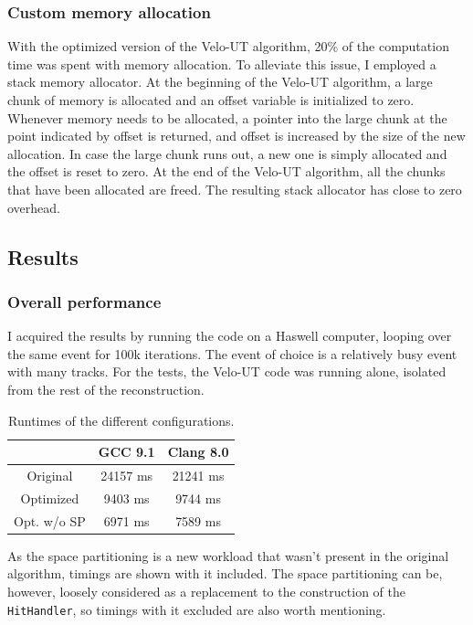 \documentclass[12pt]{article}
\newcommand{\code}[1]{\texttt{#1}}
\begin{document}
\subsubsection{Custom memory allocation}

With the optimized version of the Velo-UT algorithm, 20\% of the computation time was spent with memory allocation. To alleviate this issue, I employed a stack memory allocator. At the beginning of the Velo-UT algorithm, a large chunk of memory is allocated and an offset variable is initialized to zero. Whenever memory needs to be allocated, a pointer into the large chunk at the point indicated by offset is returned, and offset is increased by the size of the new allocation. In case the large chunk runs out, a new one is simply allocated and the offset is reset to zero. At the end of the Velo-UT algorithm, all the chunks that have been allocated are freed. The resulting stack allocator has close to zero overhead.

\subsection{Results}

\subsubsection{Overall performance}

I acquired the results by running the code on a Haswell computer, looping over the same event for 100k iterations. The event of choice is a relatively busy event with many tracks. For the tests, the Velo-UT code was running alone, isolated from the rest of the reconstruction.

\begin{table}[H]
	\centering
	\begin{tabular}{c | c | c}
		& GCC 9.1 & Clang 8.0 \\
		\hline
		Original & 24157 ms & 21241 ms \\
		\hline
		Optimized & 9403 ms & 9744 ms \\
		\hline
		Opt. w/o SP & 6971 ms & 7589 ms
	\end{tabular}
	\caption{Runtimes of the different configurations.}
	\label{tbl_runtimes_local}
\end{table}
	
As the space partitioning is a new workload that wasn't present in the original algorithm, timings are shown with it included. The space partitioning can be, however, loosely considered as a replacement to the construction of the \code{HitHandler}, so timings with it excluded are also worth mentioning.
\end{document}

